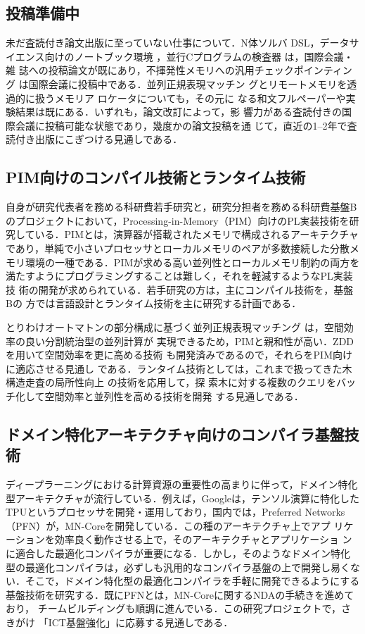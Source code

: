 \documentclass[dvipdfmx]{jsarticle}
\begin{document}
\subsection*{投稿準備中}
未だ査読付き論文出版に至っていない仕事について．N体ソルバ
DSL\cite{splash19:nbody}，データサイエンス向けのノートブック環境
\cite{splash22:mvnb,ppl23:notebook}，並行Cプログラムの検査器
\cite{ppl21c3:mixed-size_genmc,ppl23c3:mixed-size_genmc}は，国際会議・雑
誌への投稿論文が既にあり，不揮発性メモリへの汎用チェックポインティング
\cite{jssst22:checkpoint}は国際会議に投稿中である．並列正規表現マッチン
グ\cite{ppl22:sfa,ppl23c3:otf_sfa}とリモートメモリを透過的に扱うメモリア
ロケータ\cite{pro22o:far_memory,ppl23c3:far_memory}についても，その元に
なる和文フルペーパーや実験結果は既にある．いずれも，論文改訂によって，影
響力がある査読付きの国際会議に投稿可能な状態であり，幾度かの論文投稿を通
じて，直近の1--2年で査読付き出版にこぎつける見通しである．

\subsection*{PIM向けのコンパイル技術とランタイム技術}
自身が研究代表者を務める科研費若手研究と，研究分担者を務める科研費基盤B
のプロジェクトにおいて，Processing-in-Memory（PIM）向けのPL実装技術を研
究している．PIMとは，演算器が搭載されたメモリで構成されるアーキテクチャ
であり，単純で小さいプロセッサとローカルメモリのペアが多数接続した分散メ
モリ環境の一種である．PIMが求める高い並列性とローカルメモリ制約の両方を
満たすようにプログラミングすることは難しく，それを軽減するようなPL実装技
術の開発が求められている．若手研究の方は，主にコンパイル技術を，基盤Bの
方では言語設計とランタイム技術を主に研究する計画である．

とりわけオートマトンの部分構成に基づく並列正規表現マッチング
\cite{ppl22:sfa,ppl23c3:otf_sfa}は，空間効率の良い分割統治型の並列計算が
実現できるため，PIMと親和性が高い．ZDDを用いて空間効率を更に高める技術
\cite{ppl23:zdd}も開発済みであるので，それらをPIM向けに適応させる見通し
である．ランタイム技術としては，これまで扱ってきた木構造走査の局所性向上
\cite{jssst16:nbody_locality,jssst14:par_traversal}の技術を応用して，探
索木に対する複数のクエリをバッチ化して空間効率と並列性を高める技術を開発
する見通しである．

\subsection*{ドメイン特化アーキテクチャ向けのコンパイラ基盤技術}
ディープラーニングにおける計算資源の重要性の高まりに伴って，ドメイン特化
型アーキテクチャが流行している．例えば，Googleは，テンソル演算に特化した
TPUというプロセッサを開発・運用しており，国内では，Preferred
Networks（PFN）が，MN-Coreを開発している．この種のアーキテクチャ上でアプ
リケーションを効率良く動作させる上で，そのアーキテクチャとアプリケーショ
ンに適合した最適化コンパイラが重要になる．しかし，そのようなドメイン特化
型の最適化コンパイラは，必ずしも汎用的なコンパイラ基盤の上で開発し易くな
い．そこで，ドメイン特化型の最適化コンパイラを手軽に開発できるようにする
基盤技術を研究する．既にPFNとは，MN-Coreに関するNDAの手続きを進めており，
チームビルディングも順調に進んでいる．この研究プロジェクトで，さきがけ
「ICT基盤強化」に応募する見通しである．
\end{document}
